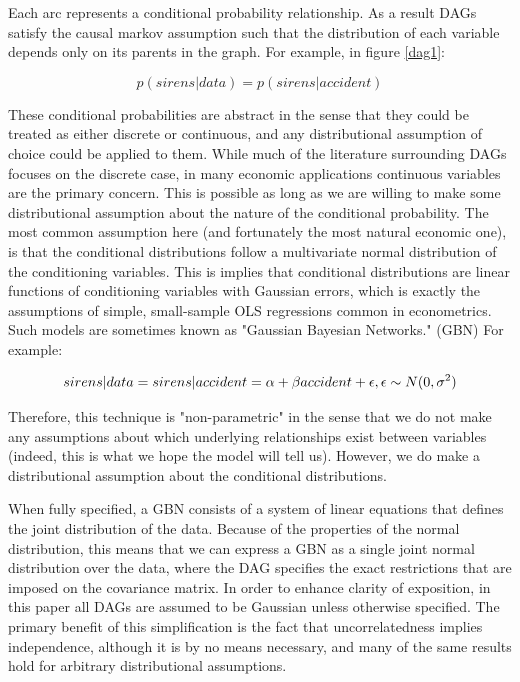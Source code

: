 \documentclass{article}
\begin{document}
Each arc represents a conditional probability relationship. As a result DAGs satisfy the causal markov assumption such that the distribution of each variable depends only on its parents in the graph. For example, in figure \ref{dag1}: 

\begin{equation}
  \label{eq1}
  p(sirens | data) = p(sirens | accident)
\end{equation}

These conditional probabilities are abstract in the sense that they could be treated as either discrete or continuous, and any distributional assumption of choice could be applied to them. While much of the literature surrounding DAGs focuses on the discrete case, in many economic applications continuous variables are the primary concern. This is possible as long as we are willing to make some distributional assumption about the nature of the conditional probability. The most common assumption here (and fortunately the most natural economic one), is that the conditional distributions follow a multivariate normal distribution of the conditioning variables. This is implies that conditional distributions are linear functions of conditioning variables with Gaussian errors, which is exactly the assumptions of simple, small-sample OLS regressions common in econometrics. Such models are sometimes known as "Gaussian Bayesian Networks." (GBN) For example:

\begin{equation}
  \label{eq2}
  sirens|data = sirens|accident = \alpha + \beta accident + \epsilon, \space \epsilon \sim N(0, \sigma^2)
\end{equation}

Therefore, this technique is "non-parametric" in the sense that we do not make any assumptions about which underlying relationships exist between variables (indeed, this is what we hope the model will tell us). However, we do make a distributional assumption about the conditional distributions.

When fully specified, a GBN consists of a system of linear equations that defines the joint distribution of the data. Because of the properties of the normal distribution, this means that we can express a GBN as a single joint normal distribution over the data, where the DAG specifies the exact restrictions that are imposed on the covariance matrix. In order to enhance clarity of exposition, in this paper all DAGs are assumed to be Gaussian unless otherwise specified. The primary benefit of this simplification is the fact that uncorrelatedness implies independence, although it is by no means necessary, and many of the same results hold for arbitrary distributional assumptions.
\end{document}
